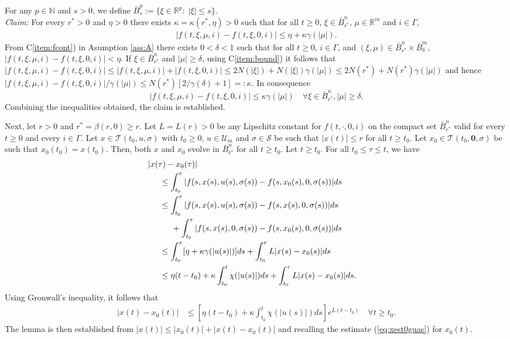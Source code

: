 \documentclass[9pt,final,journal]{IEEEtran}
\def\R{\mathbb{R}}
\def\N{\mathbb{N}}
\def\S{\mathcal{S}}
\def\T{\mathcal{T}}
\def\U{\mathcal{U}}
\begin{document}
For any $p\in\N$ and $s>0$, we define $\bar{B}^p_s := \{\xi \in \R^p:\;|\xi|\le s\}$.\\
{\em Claim:} For every $r^*>0$ and $\eta>0$ there exists $\kappa=\kappa(r^*,\eta)>0$ such that for all $t\ge 0$, $\xi \in \bar{B}^n_{r^*}$, $\mu \in \R^m$ and $i\in \Gamma$,
\begin{align}\label{eq:inI}
 |f(t,\xi,\mu,i)-f(t,\xi,0,i)|\le \eta+\kappa \gamma(|\mu|).
\end{align}
From C\ref{item:fcont}) in Asumption \ref{ass:A} there exists $0<\delta<1$ such that for all $t\ge 0$, $i\in \Gamma$, and $(\xi,\mu)\in \bar{B}^n_{r^*}\times \bar{B}^m_{\delta}$, $|f(t,\xi,\mu,i)-f(t,\xi,0,i)|<\eta$. 
%
If $\xi\in \bar{B}^n_{r^*}$ and $|\mu|\ge \delta$, using C\ref{item:bound}) it follows that $|f(t,\xi,\mu,i)-f(t,\xi,0,i)| \le |f(t,\xi,\mu,i)| + |f(t,\xi,0,i)| \le 2N(|\xi|) + N(|\xi|) \gamma(|\mu|) \le 2N(r^*) + N(r^*)\gamma(|\mu|)$ and hence $|f(t,\xi,\mu,i)-f(t,\xi,0,i)|/\gamma(|\mu|)\le N(r^*)[2/\gamma(\delta)+1]=:\kappa$. In consequence
$$  |f(t,\xi,\mu,i)-f(t,\xi,0,i)|\le \kappa \gamma(|\mu|)\quad \forall \xi\in \bar{B}_{r^*}^n, |\mu|\ge \delta.$$
Combining the inequalities obtained, the claim is established.

Next, let $r>0$ and $r^*=\beta(r,0)\ge r$. Let $L=L(r) > 0$ be any Lipschitz constant for $f(t,\cdot,0,i)$ on the compact set $\bar{B}^n_{r^*}$ valid for every $t\ge 0$ and every $i\in \Gamma$.  Let $x\in \T(t_0,u,\sigma)$ with $t_0\ge 0$, $u\in \U_m$ and $\sigma\in \S$ be such that $|x(t)|\le r$ for all $t\ge t_0$.  Let $x_0\in \T(t_0,\mathbf{0},\sigma)$ be such that $x_0(t_0) = x(t_0)$. Then, both $x$ and $x_0$ evolve in $\bar{B}^n_{r^*}$ for all $t\ge t_0$.
%
Let $t\ge t_0$. For all $t_0\le \tau\le t$, we have
\begin{align*}
  \lefteqn{|x(\tau) - x_0(\tau)|}\hspace{5mm}\\
&\le \int_{t_0}^{\tau} |f(s,x(s),u(s),\sigma(s)) - f(s,x_0(s),0,\sigma(s))| ds \\
&\le \int_{t_0}^{\tau} |f(s,x(s),u(s),\sigma(s)) - f(s,x(s),0,\sigma(s))| ds\\
&\hspace{5mm} + \int_{t_0}^{\tau} |f(s,x(s),0,\sigma(s)) - f(s,x_0(s),0,\sigma(s))| ds\\
&\le \int_{t_0}^{\tau} [\eta+\kappa \gamma(|u(s)|)] ds + \int_{t_0}^{\tau} L |x(s) - x_0(s)| ds \\
&\le \eta(t-t_0)+\kappa \int_{t_0}^{t} \chi(|u(s)|) ds + \int_{t_0}^{\tau} L |x(s) - x_0(s)| ds.
\end{align*}
Using Gronwall's inequality, it follows that
\begin{align*}
  |x(t) - x_0(t)| &\le \left [\eta(t-t_0)+ \kappa \int_{t_0}^{t} \chi(|u(s)|) ds \right ]  e^{L(t-t_0)}\quad \forall t\ge t_0.
\end{align*} 
The lemma is then established from $|x(t)| \le |x_0(t)| + |x(t) - x_0(t)|$ and recalling the estimate (\ref{eq:xest0guas}) for $x_0(t)$.\hfill\QED
\end{document}
